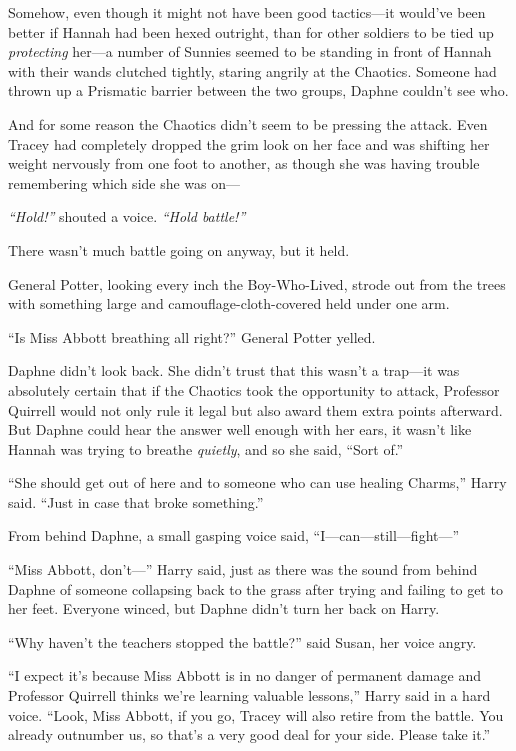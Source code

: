 Somehow, even though it might not have been good tactics---it would've
been better if Hannah had been hexed outright, than for other soldiers
to be tied up \emph{protecting} her---a number of Sunnies seemed to be
standing in front of Hannah with their wands clutched tightly, staring
angrily at the Chaotics. Someone had thrown up a Prismatic barrier
between the two groups, Daphne couldn't see who.

And for some reason the Chaotics didn't seem to be pressing the attack.
Even Tracey had completely dropped the grim look on her face and was
shifting her weight nervously from one foot to another, as though she
was having trouble remembering which side she was on---

\emph{``Hold!''} shouted a voice. \emph{``Hold battle!''}

There wasn't much battle going on anyway, but it held.

General Potter, looking every inch the Boy-Who-Lived, strode out from
the trees with something large and camouflage-cloth-covered held under
one arm.

``Is Miss Abbott breathing all right?'' General Potter yelled.

Daphne didn't look back. She didn't trust that this wasn't a trap---it
was absolutely certain that if the Chaotics took the opportunity to
attack, Professor Quirrell would not only rule it legal but also award
them extra points afterward. But Daphne could hear the answer well
enough with her ears, it wasn't like Hannah was trying to breathe
\emph{quietly}, and so she said, ``Sort of.''

``She should get out of here and to someone who can use healing
Charms,'' Harry said. ``Just in case that broke something.''

From behind Daphne, a small gasping voice said,
``I---can---still---fight---''

``Miss Abbott, don't---'' Harry said, just as there was the sound from
behind Daphne of someone collapsing back to the grass after trying and
failing to get to her feet. Everyone winced, but Daphne didn't turn her
back on Harry.

``Why haven't the teachers stopped the battle?'' said Susan, her voice
angry.

``I expect it's because Miss Abbott is in no danger of permanent damage
and Professor Quirrell thinks we're learning valuable lessons,'' Harry
said in a hard voice. ``Look, Miss Abbott, if you go, Tracey will also
retire from the battle. You already outnumber us, so that's a very good
deal for your side. Please take it.''

